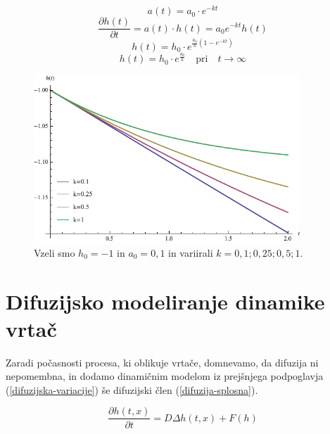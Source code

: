 \documentclass[a4paper, twoside, 12pt]{book}
\begin{document}
    \begin{equation}
      a(t) = a_0 \cdot e^{- k t}
      \label{dinamicna-gompertzova-faktor}
    \end{equation}
    \begin{equation}
      \frac{\partial h(t)}{\partial t} = a(t) \cdot h(t) = a_0 e^{ -k t} h(t)
      \label{dinamicna-gompertzova}
    \end{equation}
    \begin{equation}
      h(t) = h_0 \cdot e^{\frac{a_0}{k}(1-e^{-kt})}
      \label{dinamicna-gompertzova-resitev}
    \end{equation}
    \begin{equation}
      h(t) = h_0 \cdot e^{\frac{a_0}{k}} \quad \text{pri} \quad t \rightarrow \infty
      \label{dinamicna-gompertzova-limita}
    \end{equation}

    \begin{figure}[h!]
      \begin{center}
        \includegraphics[width=10cm]{slike/gompertzova-rast}
      \end{center}
      \caption{Vzeli smo $h_0=-1$ in $a_0=0,1$ in variirali $k=0,1;0,25;0,5;1$.}
      \label{fig:gompertzova-rast}
    \end{figure}

    \section{Difuzijsko modeliranje dinamike vrtač}

    Zaradi počasnosti procesa, ki oblikuje vrtače, domnevamo, da difuzija ni nepomembna, in dodamo dinamičnim modelom iz prejšnjega podpoglavja  (\ref{difuzijska-variacije}) še difuzijski člen (\ref{difuzija-splosna}).

    \begin{equation}
      \frac{ \partial h(t,x) }{ \partial t} = D \Delta h(t,x) + F(h)
      \label{difuzija-splosna}
    \end{equation}
\end{document}
